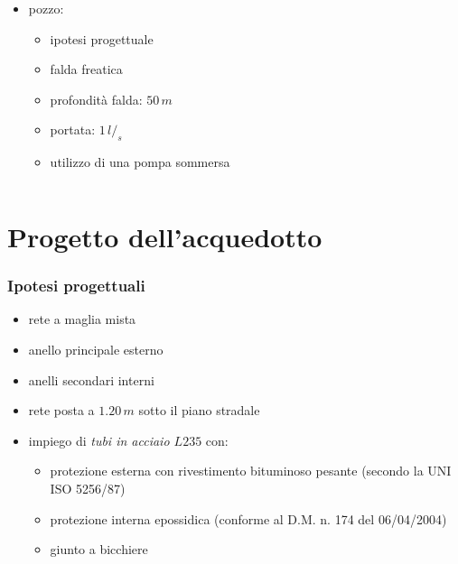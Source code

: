 \documentclass{beamer}
\begin{document}
\begin{frame}
\begin{columns}
\begin{column}{.5\textwidth}
\begin{itemize}
      \item pozzo:
      \begin{itemize}
       \item ipotesi progettuale
       \item falda freatica
       \item profondità falda: $50\,m$
       \item portata: $1\,l/_s$
       \item utilizzo di una pompa sommersa       
      \end{itemize}
     \end{itemize}
    \end{column}
 \end{columns}
\end{frame}


\section{Progetto dell'acquedotto}
\begin{frame}
 \frametitle{Ipotesi progettuali}
 \begin{itemize}[<+->]
  \item rete a maglia mista
  \item anello principale esterno
  \item anelli secondari interni
  \item rete posta a $1.20\,m$ sotto il piano stradale
  \item impiego di \emph{tubi in acciaio $L235$} con:
  \begin{itemize}[<.->]
   \item protezione esterna con rivestimento bituminoso pesante (secondo la UNI ISO 5256/87)
   \item protezione interna epossidica (conforme al D.M. n. 174 del 06/04/2004)
   \item giunto a bicchiere
  \end{itemize}
 \end{itemize}
\end{frame}
\end{document}
